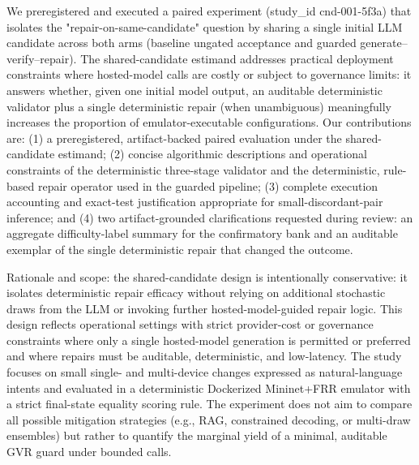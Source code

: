 \documentclass[conference]{IEEEtran}
\begin{document}
We preregistered and executed a paired experiment (study\_id cnd-001-5f3a) that isolates the "repair-on-same-candidate" question by sharing a single initial LLM candidate across both arms (baseline ungated acceptance and guarded generate--verify--repair). The shared-candidate estimand addresses practical deployment constraints where hosted-model calls are costly or subject to governance limits: it answers whether, given one initial model output, an auditable deterministic validator plus a single deterministic repair (when unambiguous) meaningfully increases the proportion of emulator-executable configurations. Our contributions are: (1) a preregistered, artifact-backed paired evaluation under the shared-candidate estimand; (2) concise algorithmic descriptions and operational constraints of the deterministic three-stage validator and the deterministic, rule-based repair operator used in the guarded pipeline; (3) complete execution accounting and exact-test justification appropriate for small-discordant-pair inference; and (4) two artifact-grounded clarifications requested during review: an aggregate difficulty-label summary for the confirmatory bank and an auditable exemplar of the single deterministic repair that changed the outcome.

Rationale and scope: the shared-candidate design is intentionally conservative: it isolates deterministic repair efficacy without relying on additional stochastic draws from the LLM or invoking further hosted-model-guided repair logic. This design reflects operational settings with strict provider-cost or governance constraints where only a single hosted-model generation is permitted or preferred and where repairs must be auditable, deterministic, and low-latency. The study focuses on small single- and multi-device changes expressed as natural-language intents and evaluated in a deterministic Dockerized Mininet+FRR emulator with a strict final-state equality scoring rule. The experiment does not aim to compare all possible mitigation strategies (e.g., RAG, constrained decoding, or multi-draw ensembles) but rather to quantify the marginal yield of a minimal, auditable GVR guard under bounded calls.
\end{document}

